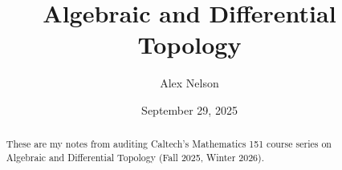 \documentclass{article}
\title{Algebraic and Differential Topology}
\author{Alex Nelson}
\date{September 29, 2025}
\begin{document}
\maketitle

\begin{abstract}
These are my notes from auditing Caltech's Mathematics 151 course
series on Algebraic and Differential Topology (Fall 2025, Winter 2026).
\end{abstract}

% 




\end{document}
